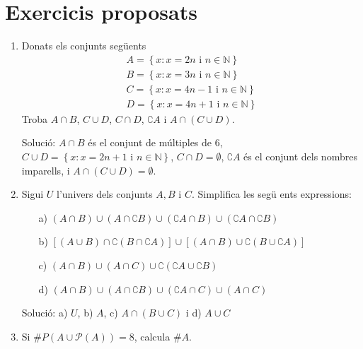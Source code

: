 \chapter{Exercicis proposats}
\label{cap:exercicis}

\begin{enumerate}
\item Donats els conjunts seg\"{u}ents%
\begin{equation*}
\begin{array}{l}
A=\left\{ x:x=2n\text{ \ i \ }n\in \mathbb{N}\right\} \\
B=\left\{ x:x=3n\text{ \ i \ }n\in \mathbb{N}\right\} \\
C=\left\{ x:x=4n-1\text{ \ i \ }n\in \mathbb{N}\right\} \\
D=\left\{ x:x=4n+1\text{ \ i \ }n\in \mathbb{N}\right\}%
\end{array}%
\end{equation*}%
Troba $A\cap B$, $C\cup D$, $C\cap D$, $\complement A$ i $A\cap (C\cup D)$.

Soluci\'{o}: $A\cap B$ \'{e}s el conjunt de m\'{u}ltiples de 6, $C\cup
D=\left\{ x:x=2n+1\text{ \ i \ }n\in \mathbb{N}\right\} $, $C\cap
D=\emptyset $, $\complement A$ \'{e}s el conjunt dels nombres imparells, i $%
A\cap (C\cup D)=\emptyset $.

\item Sigui $U$ l'univers dels conjunts $A,B$ i $C$. Simplifica les seg\"{u}%
ents expressions:

\begin{enumerate}
\item[a)] $(A\cap B)\cup (A\cap \complement B)\cup (\complement A\cap B)\cup
(\complement A\cap \complement B)$

\item[b)] $\left[ (A\cup B)\cap \complement \left( B\cap \complement
A\right) \right] \cup \left[ (A\cap B)\cup \complement \left( B\cup
\complement A\right) \right] $

\item[c)] $(A\cap B)\cup (A\cap C)\cup \complement \left( \complement A\cup
\complement B\right) $

\item[d)] $(A\cap B)\cup (A\cap \complement B)\cup (\complement A\cap C)\cup
(A\cap C)$
\end{enumerate}

Soluci\'{o}: a) $U$, b) $A$, c) $A\cap (B\cup C)$ i d) $A\cup C$

\item Si $\#P\left( A\cup \mathcal{P}(A)\right) =8$, calcula $\#A$.


\end{enumerate}
